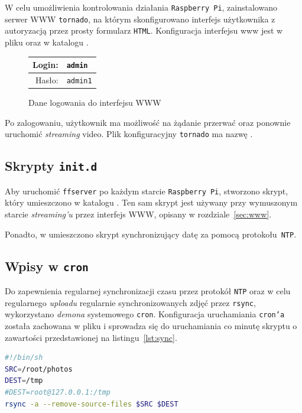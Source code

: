 \documentclass{article}
\begin{document}
W celu umożliwienia kontrolowania działania \texttt{Raspberry~Pi}, zainstalowano serwer WWW \texttt{tornado}, na którym skonfigurowano interfejs użytkownika z autoryzacją przez prosty formularz \texttt{HTML}. Konfiguracja interfejsu www jest w pliku  oraz w katalogu .
\begin{figure}[H]
\centering
\begin{tabular}{r|l}
Login: & \texttt{admin}\\
\hline
Hasło: & \texttt{admin1}\\
\end{tabular}
\caption{Dane logowania do interfejsu WWW}
\end{figure}
Po zalogowaniu, użytkownik ma możliwość na żądanie przerwać oraz ponownie uruchomić \emph{streaming} video. Plik konfiguracyjny \texttt{tornado} ma nazwę .


\subsection{Skrypty \texttt{init.d}}

Aby uruchomić \texttt{ffserver} po każdym starcie \texttt{Raspberry~Pi}, stworzono skrypt, który umieszczono w katalogu . Ten sam skrypt jest używany przy wymuszonym starcie \emph{streaming'u} przez interfejs WWW, opisany w rozdziale~\ref{sec:www}.

Ponadto, w  umieszczono skrypt synchronizujący datę za pomocą protokołu~\texttt{NTP}.


\subsection{Wpisy w \texttt{cron}}

Do zapewnienia regularnej synchronizacji czasu przez protokół \texttt{NTP} oraz w celu regularnego \emph{uploadu} regularnie synchronizowanych zdjęć przez \texttt{rsync}, wykorzystano \emph{demona} systemowego \texttt{cron}. Konfiguracja uruchamiania \texttt{cron'a} została zachowana w pliku  i sprowadza się do uruchamiania co minutę skryptu  o zawartości przedstawionej na listingu~\ref{lst:sync}.
\begin{lstlisting}[caption={Zawartość pliku \texttt{/root/sync.sh}},label=lst:sync,language=bash,frame=single,breaklines,captionpos=b]
#!/bin/sh
SRC=/root/photos
DEST=/tmp
#DEST=root@127.0.0.1:/tmp
rsync -a --remove-source-files $SRC $DEST
\end{lstlisting}
\end{document}
